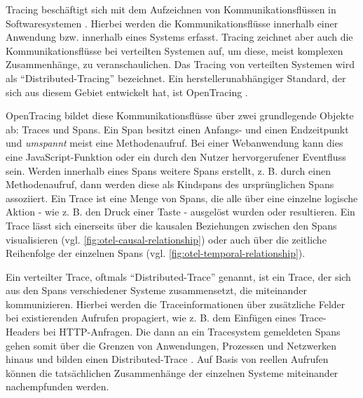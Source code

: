 Tracing beschäftigt sich mit dem Aufzeichnen von Kommunikationsflüssen in Softwaresystemen \cite{TowardsPerformanceToolingInteroperability}. Hierbei werden die Kommunikationsflüsse innerhalb einer Anwendung bzw. innerhalb eines Systems erfasst. Tracing zeichnet aber auch die Kommunikationsflüsse bei verteilten Systemen auf, um diese, meist komplexen Zusammenhänge, zu veranschaulichen. Das Tracing von verteilten Systemen wird als \enquote{Distributed-Tracing} bezeichnet. Ein herstellerunabhängiger Standard, der sich aus diesem Gebiet entwickelt hat, ist OpenTracing \cite{OpenTracing}.

OpenTracing bildet diese Kommunikationsflüsse über zwei grundlegende Objekte ab: Traces und Spans. Ein Span besitzt einen Anfangs- und einen Endzeitpunkt und \textit{umspannt} meist eine Methodenaufruf. Bei einer Webanwendung kann dies eine JavaScript-Funktion oder ein durch den Nutzer hervorgerufener Eventfluss sein. Werden innerhalb eines Spans weitere Spans erstellt, z. B. durch einen Methodenaufruf, dann werden diese als Kindspans des ursprünglichen Spans assoziiert. Ein Trace ist eine Menge von Spans, die alle über eine einzelne logische Aktion - wie z. B. den Druck einer Taste - ausgelöst wurden oder resultieren. Ein Trace lässt sich einerseits über die kausalen Beziehungen zwischen den Spans visualisieren (vgl. \autoref{fig:otel-causal-relationship}) oder auch über die zeitliche Reihenfolge der einzelnen Spans (vgl. \autoref{fig:otel-temporal-relationship}).

Ein verteilter Trace, oftmals \enquote{Distributed-Trace} genannt, ist ein Trace, der sich aus den Spans verschiedener Systeme zusammensetzt, die miteinander kommunizieren. Hierbei werden die Traceinformationen über zusätzliche Felder bei existierenden Aufrufen propagiert, wie z. B. dem Einfügen eines Trace-Headers bei HTTP-Anfragen. Die dann an ein Tracesystem gemeldeten Spans gehen somit über die Grenzen von Anwendungen, Prozessen und Netzwerken hinaus und bilden einen Distributed-Trace \cite{OpenTracingSpecification}. Auf Basis von reellen Aufrufen können die tatsächlichen Zusammenhänge der einzelnen Systeme miteinander nachempfunden werden.

 
